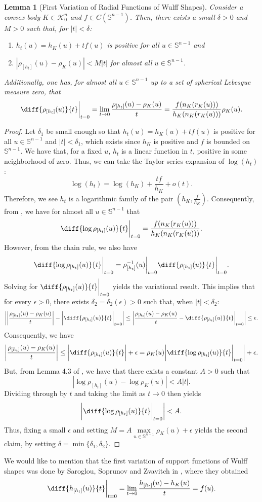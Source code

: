 \documentclass[11pt]{amsart}
\newtheorem{lemma}[theorem]{Lemma}
\theoremstyle{definition}
\theoremstyle{remark}
\numberwithin{equation}{section}
\newcommand{\s}{\mathbb{S}}
\newcommand{\conbod}{\mathcal{K}^n}
\begin{document}
	\begin{lemma}[First Variation of Radial Functions of Wulff Shapes]
	\label{l:first}
	Consider a convex body $K\in\conbod_0$ and $f\in C(\s^{n-1})$. Then, there exists a small $\delta >0$ and $M>0$ such that, for $|t|< \delta $:
 \begin{enumerate}
     \item $h_t(u)=h_K(u)+tf(u)$ is positive for all $u\in\s^{n-1}$ and
     \item $|\rho_{[h_t]}(u)-\rho_{K}(u)|<M|t|$ for almost all $u\in\s^{n-1}$.
 \end{enumerate} Additionally, one has, for almost all $u\in\s^{n-1}$ up to a set of spherical Lebesgue measure zero, that
	$$\diff{\rho_{[h_t]}(u)}{t}\bigg|_{t=0}=\lim_{t\to 0}\frac{\rho_{[h_t]}(u)-\rho_{K}(u)}{t}=\frac{f(n_{K}(r_{K}(u)))}{h_K(n_K(r_K(u)))}\rho_K(u).$$
	\end{lemma}
	\begin{proof} Let $\delta_1$ be small enough so that $h_t(u)=h_K(u)+tf(u)$ is positive for all $u\in\s^{n-1}$ and $|t|< \delta_1$, which exists since $h_K$ is positive and $f$ is bounded on $\s^{n-1}$.	We have that, for a fixed $u$, $h_t$ is a linear function in $t$, positive in some neighborhood of zero. Thus, we can take the Taylor series expansion of $\log(h_t)$: $$\log(h_t)=\log(h_K)+\frac{tf}{h_K}+o(t).$$ Therefore, we see $h_t$ is a logarithmic family of the pair $(h_K,\frac{f}{h_K})$. Consequently, from \cite[Lemma 4.3]{HLYZ16}, we have for almost all $u\in\s^{n-1}$ that
	$$\diff{\log\rho_{[h_t]}(u)}{t}\bigg|_{t=0}=\frac{f(n_{K}(r_{K}(u)))}{h_K(n_K(r_K(u)))}.$$
	However, from the chain rule, we also have $$\diff{\log\rho_{[h_t]}(u)}{t}\bigg|_{t=0}=\rho^{-1}_{[h_t]}(u)\bigg|_{t=0}\diff{\rho_{[h_t]}(u)}{t}\bigg|_{t=0}.$$
	Solving for $\diff{\rho_{[h_t]}(u)}{t}\bigg|_{t=0}$ yields the variational result. This implies that for every $\epsilon>0$, there exists $\delta_2=\delta_2(\epsilon)>0$ such that, when $|t|<\delta_2:$
	$$\bigg|\bigg|\frac{\rho_{[h_t]}(u)-\rho_{K}(u)}{t}\bigg|-\bigg|\diff{\rho_{[h_t]}(u)}{t}\bigg|_{t=0}\bigg|\leq\bigg|\frac{\rho_{[h_t]}(u)-\rho_{K}(u)}{t}- \diff{\rho_{[h_t]}(u)}{t} \bigg|_{t=0}\bigg|\leq\epsilon.$$
	Consequently, we have
	$$\bigg|\frac{\rho_{[h_t]}(u)-\rho_{K}(u)}{t}\bigg|\leq\bigg|\diff{\rho_{[h_t]}(u)}{t} \bigg|+\epsilon=\rho_K(u)\bigg|\diff{\log\rho_{[h_t]}(u)}{t}\bigg|_{t=0}\bigg| +\epsilon. $$
	But, from Lemma 4.3 of \cite{HLYZ16}, we have that there exists a constant $A>0$ such that $$|\log\rho_{[h_t]}(u)-\log\rho_{K}(u)|<A|t|.$$ Dividing through by $t$ and taking the limit as $t\to 0$ then yields $$\bigg|\diff{\log\rho_{[h_t]}(u)}{t}\bigg|_{t=0}\bigg|<A.$$ Thus, fixing a small $\epsilon$ and setting $M=A \underset{u\in\s^{n-1}}{\max} \rho_K(u)+\epsilon$ yields the second claim, by setting $\delta=\min\{\delta_1,\delta_2\}$.
	\end{proof}
	We would like to mention that the first variation of support functions of Wulff shapes was done by Saroglou, Soprunov and Zvavitch in \cite{SSZ19}, where they obtained
	$$\diff{h_{[h_t]}(u)}{t}\bigg|_{t=0}=\lim_{t\to 0}\frac{h_{[h_t]}(u)-h_{K}(u)}{t}=f(u).$$
\end{document}
